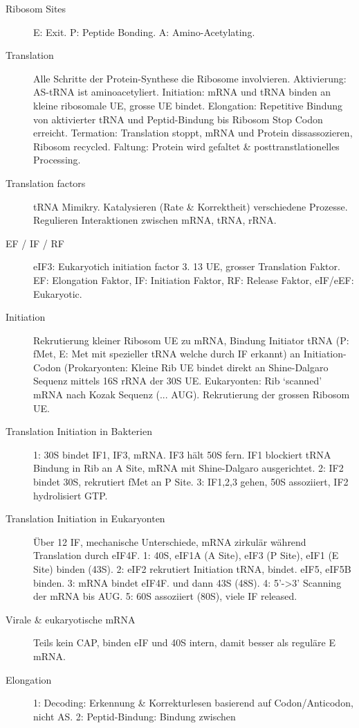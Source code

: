 \documentclass[a4paper,twocolumn,usegeometry,english,fontsize=5,DIV=28]{scrartcl}
\begin{document}
\begin{description}
	\item[Ribosom Sites] E: Exit. P: Peptide Bonding. A: Amino-Acetylating.
	\item[Translation] Alle Schritte der Protein-Synthese die Ribosome
		involvieren. Aktivierung: AS-tRNA ist aminoacetyliert.
		Initiation: mRNA und tRNA binden an kleine ribosomale UE,
		grosse UE bindet. Elongation: Repetitive Bindung von
		aktivierter tRNA und Peptid-Bindung bis Ribosom Stop Codon
		erreicht. Termation: Translation stoppt, mRNA und Protein
		dissassozieren, Ribosom recycled. Faltung: Protein wird
		gefaltet \& posttranstlationelles Processing.
	\item[Translation factors] tRNA Mimikry. Katalysieren (Rate \&
		Korrektheit) verschiedene Prozesse. Regulieren Interaktionen
		zwischen mRNA, tRNA, rRNA.
	\item[EF / IF / RF] eIF3: Eukaryotich initiation factor 3. 13 UE, grosser
		Translation Faktor. EF: Elongation Faktor, IF: Initiation
		Faktor, RF: Release Faktor, eIF/eEF: Eukaryotic.
	\item[Initiation] Rekrutierung kleiner Ribosom UE zu mRNA, Bindung
		Initiator tRNA (P: fMet, E: Met mit spezieller tRNA welche
		durch IF erkannt) an Initiation-Codon (Prokaryonten: Kleine Rib
		UE bindet direkt an Shine-Dalgaro Sequenz mittels 16S rRNA der
		30S UE. Eukaryonten: Rib `scanned' mRNA nach Kozak Sequenz (...
		AUG). Rekrutierung der grossen Ribosom UE.
	\item[Translation Initiation in Bakterien] 1: 30S bindet IF1, IF3,
		mRNA. IF3 hält 50S fern. IF1 blockiert tRNA Bindung in Rib an A
		Site, mRNA mit Shine-Dalgaro ausgerichtet. 2: IF2 bindet 30S,
		rekrutiert fMet an P Site. 3: IF1,2,3 gehen, 50S assoziiert,
		IF2 hydrolisiert GTP.
	\item[Translation Initiation in Eukaryonten] Über 12 IF, mechanische
		Unterschiede, mRNA zirkulär während Translation durch eIF4F. 1:
		40S, eIF1A (A Site), eIF3 (P Site), eIF1 (E Site) binden (43S). 2:
		eIF2 rekrutiert Initiation tRNA, bindet. eIF5, eIF5B binden. 3:
		mRNA bindet eIF4F. und dann 43S (48S). 4: 5'->3' Scanning der
		mRNA bis AUG. 5: 60S assoziiert (80S), viele IF released.
	\item[Virale \& eukaryotische mRNA] Teils kein CAP, binden eIF und 40S
		intern, damit besser als reguläre E mRNA.
	\item[Elongation] 1: Decoding: Erkennung \& Korrekturlesen basierend auf
		Codon/Anticodon, nicht AS. 2: Peptid-Bindung: Bindung zwischen

\end{description}
\end{document}
